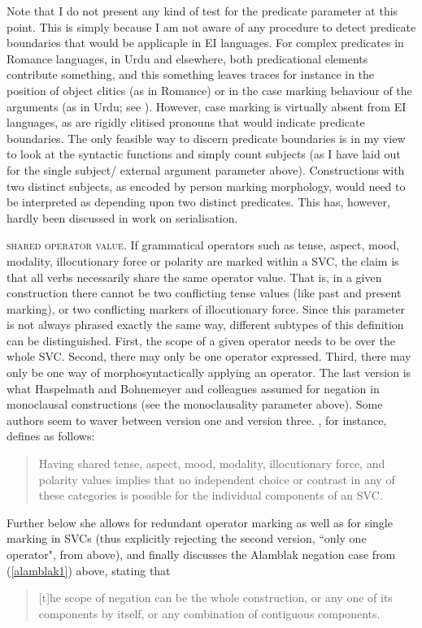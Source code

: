 Note that I do not present any kind of test for the predicate parameter at this point. This is simply because I am not aware of any procedure to detect predicate boundaries that would be applicaple in EI languages. For complex predicates in Romance languages, in Urdu and elsewhere, both predicational elements contribute something, and this something leaves traces for instance in the position of object clitics (as in Romance) or in the case marking behaviour of the arguments (as in Urdu; see \citealt[511]{butt2010light}). However, case marking is virtually absent from EI languages, as are rigidly clitised pronouns that would indicate predicate boundaries. The only feasible way to discern predicate boundaries is in my view to look at the syntactic functions and simply count subjects (as I have laid out for the single subject/ external argument parameter above). Constructions with two distinct subjects, as encoded by person marking morphology, would need to be interpreted as depending upon two distinct predicates. This has, however, hardly been discussed in work on serialisation.

\textsc{shared operator value}. If grammatical operators such as tense, aspect, mood, modality, illocutionary force or polarity are marked within a SVC, the claim is that all verbs necessarily share the same operator value. That is, in a given construction there cannot be two conflicting tense values (like past and present marking), or two conflicting markers of illocutionary force. Since this parameter is not always phrased exactly the same way, different subtypes of this definition can be distinguished. First, the scope of a given operator needs to be over the whole SVC. Second, there may only be one operator expressed. Third, there may only be one way of morphosyntactically applying an operator. The last version is what Haspelmath and Bohnemeyer and colleagues assumed for negation in monoclausal constructions (see the monoclausality parameter above). Some authors seem to waver between version one and version three. \citet[8]{Aikhenvald2006}, for instance, defines as follows: 

\begin{quote}Having shared tense, aspect, mood, modality, illocutionary force, and polarity values implies that no independent choice or contrast in any of these categories is possible for the individual components of an SVC. \end{quote}


Further below she allows for redundant operator marking as well as for single marking in SVCs (thus explicitly rejecting the second version, ``only one operator", from above), and finally discusses the Alamblak negation case from (\ref{alamblak1}) above, stating that \begin{quote}[t]he scope of negation can be the whole construction, or any one of its components by itself, or any combination of contiguous components. \citep[8f.]{Aikhenvald2006}\end{quote}

